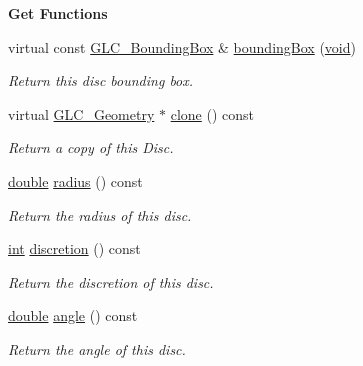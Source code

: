 \begin{Indent}{\bf Get Functions}\par
\begin{DoxyCompactItemize}
\item 
virtual const \hyperlink{class_g_l_c___bounding_box}{G\-L\-C\-\_\-\-Bounding\-Box} \& \hyperlink{class_g_l_c___disc_a8e5f9ba5e641a72beb44dfa1cc2ae594}{bounding\-Box} (\hyperlink{group___u_a_v_objects_plugin_ga444cf2ff3f0ecbe028adce838d373f5c}{void})
\begin{DoxyCompactList}\small\item\em Return this disc bounding box. \end{DoxyCompactList}\item 
virtual \hyperlink{class_g_l_c___geometry}{G\-L\-C\-\_\-\-Geometry} $\ast$ \hyperlink{class_g_l_c___disc_aaef9a0128177795712da19f04d264016}{clone} () const 
\begin{DoxyCompactList}\small\item\em Return a copy of this Disc. \end{DoxyCompactList}\item 
\hyperlink{_super_l_u_support_8h_a8956b2b9f49bf918deed98379d159ca7}{double} \hyperlink{class_g_l_c___disc_ab5dc631e888b10d7f24784d98c957315}{radius} () const 
\begin{DoxyCompactList}\small\item\em Return the radius of this disc. \end{DoxyCompactList}\item 
\hyperlink{ioapi_8h_a787fa3cf048117ba7123753c1e74fcd6}{int} \hyperlink{class_g_l_c___disc_ad482eda448781f6b8e058abd5e849d9c}{discretion} () const 
\begin{DoxyCompactList}\small\item\em Return the discretion of this disc. \end{DoxyCompactList}\item 
\hyperlink{_super_l_u_support_8h_a8956b2b9f49bf918deed98379d159ca7}{double} \hyperlink{class_g_l_c___disc_a3442c455956edcbafd6ccf272e5fe329}{angle} () const 
\begin{DoxyCompactList}\small\item\em Return the angle of this disc. \end{DoxyCompactList}\end{DoxyCompactItemize}
\end{Indent}
